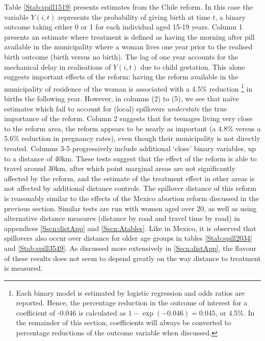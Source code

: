 Table \ref{Stab:spill1519} presents estimates from the Chile reform.  In this case 
the variable $Y(i,t)$ represents the probability of giving birth at time $t$, a 
binary outcome taking either 0 or 1 for each individual aged 15-19 years. Column 1 
presents an estimate where treatment is defined as having the morning after pill 
available in the municipality where a woman lives one year prior to the realised 
birth outcome (birth versus no birth).  The lag of one year accounts for the 
mechanical delay in realisations of $Y(i,t)$ due to child gestation.  This alone 
suggests important effects of the reform: having the reform available in the 
municipality of residence of the woman is associated with a 4.5\% reduction%
\footnote{Each binary model is estimated by logistic regression and odds ratios
are reported.  Hence, the percentage reduction in the outcome of interest for a
coefficient of -0.046 is calculated as $1-\exp(-0.046)=0.045$, or 4.5\%.  In the
remainder of this section, coefficients will always be converted to percentage
reductions of the outcome variable when discussed.} in births the following year.  
However, in columns (2) to (5), we see that na\"ive estimates which fail to account 
for (local) spillovers \emph{understate} the true importance of the reform.  Column 
2 suggests that for teenages living very close to the reform area, the reform 
appears to be nearly as important (a 4.8\% versus a 5.6\% reduction in pregnancy
rates), even though their municipality is not directly treated.  Columns 3-5 
progressively  include additional `close' binary variables, up to a distance of
40km.  These tests suggest that the effect of the reform is able to travel around 
30km, after which point marginal areas are not significantly affected by the 
reform, and the estimate of the treatment effect in other areas is not affected by
additional distance controls. The spillover distance of this reform is reasonably 
similar to the effects of the Mexico abortion reform discussed in the previous 
section.  Similar tests are run with women aged over 20, as well as using 
alternative distance measures (distance by road and travel time by road) in 
appendices \ref{Sscn:distApp} and \ref{Sscn:Atables}.  Like in Mexico, it is 
observed that spillovers also occur over distance for older age groups in tables
\ref{Stab:spill2034} and \ref{Stab:spill3549}.  As discussed more extensively
in \ref{Sscn:distApp}, the flavour of these results does not seem to depend 
greatly on the way distance to treatment is measured.

